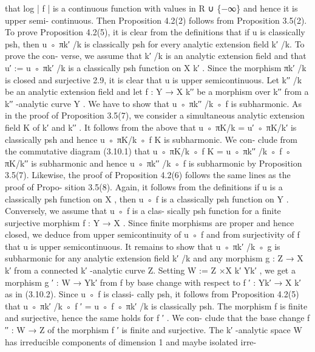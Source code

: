 \documentclass[
  10pt,
]{article}
\newenvironment{Shaded}{}{}
\newcommand{\NormalTok}[1]{#1}
\begin{document}
\begin{Shaded}
\begin{Highlighting}[]
\NormalTok{that log | f | is a continuous function with values in R ∪ \{−∞\} and hence it is upper semi{-}}
\NormalTok{continuous. Then Proposition 4.2(2) follows from Proposition 3.5(2).}
\NormalTok{    To prove Proposition 4.2(5), it is clear from the definitions that if u is classically psh,}
\NormalTok{then u ◦ πk′ /k is classically psh for every analytic extension field k′ /k. To prove the con{-}}
\NormalTok{verse, we assume that k′ /k is an analytic extension field and that u′ := u ◦ πk′ /k is a}
\NormalTok{classically psh function on X k′ . Since the morphism πk′ /k is closed and surjective 2.9,}
\NormalTok{it is clear that u is upper semicontinuous. Let k′′ /k be an analytic extension field and}
\NormalTok{let f : Y → X k′′ be a morphism over k′′ from a k′′ {-}analytic curve Y . We have to show}
\NormalTok{that u ◦ πk′′ /k ◦ f is subharmonic. As in the proof of Proposition 3.5(7), we consider}
\NormalTok{a simultaneous analytic extension field K of k′ and k′′ . It follows from the above that}
\NormalTok{u ◦ πK/k = u′ ◦ πK/k′ is classically psh and hence u ◦ πK/k ◦ f K is subharmonic. We con{-}}
\NormalTok{clude from the commutative diagram (3.10.1) that u ◦ πK/k ◦ f K = u ◦ πk′′ /k ◦ f ◦ πK/k′′ is}
\NormalTok{subharmonic and hence u ◦ πk′′ /k ◦ f is subharmonic by Proposition 3.5(7).}
\NormalTok{    Likewise, the proof of Proposition 4.2(6) follows the same lines as the proof of Propo{-}}
\NormalTok{sition 3.5(8). Again, it follows from the definitions if u is a classically psh function on X ,}
\NormalTok{then u ◦ f is a classically psh function on Y . Conversely, we assume that u ◦ f is a clas{-}}
\NormalTok{sically psh function for a finite surjective morphism f : Y → X . Since finite morphisms}
\NormalTok{are proper and hence closed, we deduce from upper semicontinuity of u ◦ f and from}
\NormalTok{surjectivity of f that u is upper semicontinuous. It remains to show that u ◦ πk′ /k ◦ g is}
\NormalTok{subharmonic for any analytic extension field k′ /k and any morphism g : Z → X k′ from a}
\NormalTok{connected k′ {-}analytic curve Z. Setting W := Z ×X k′ Yk′ , we get a morphism g ′ : W → Yk′}
\NormalTok{from f by base change with respect to f ′ : Yk′ → X k′ as in (3.10.2). Since u ◦ f is classi{-}}
\NormalTok{cally psh, it follows from Proposition 4.2(5) that u ◦ πk′ /k ◦ f ′ = u ◦ f ◦ πk′ /k is classically}
\NormalTok{psh. The morphism f is finite and surjective, hence the same holds for f ′ . We con{-}}
\NormalTok{clude that the base change f ′′ : W → Z of the morphism f ′ is finite and surjective. The}
\NormalTok{k′ {-}analytic space W has irreducible components of dimension 1 and maybe isolated irre{-}}

\end{Highlighting}
\end{Shaded}
\end{document}
